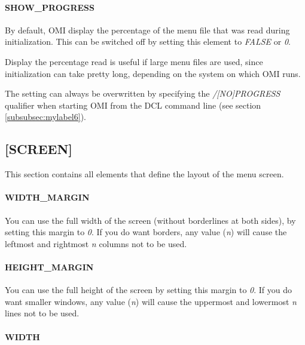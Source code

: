 \documentclass[a4paper]{book}
\newcommand{\vs}{\vspace{3mm}}
\begin{document}
\paragraph{SHOW{\_}PROGRESS}
\label{para:mylabel2}

By default, OMI display the percentage of the menu file that was read during 
initialization. This can be switched off by setting this element to \textsl{FALSE} or \textsl{0}.

\vs

Display the percentage read is useful if large menu files are used, since 
initialization can take pretty long, depending on the system on which OMI 
runs.

\vs

The setting can always be overwritten by specifying the \textsl{/[NO]PROGRESS} 
qualifier when starting OMI from the DCL command line (see section
\ref{subsubsec:mylabel6}).

\subsection{[SCREEN]}
\label{subsubsec:mylabel17}

This section contains all elements that define the layout of the menu 
screen.

\paragraph{WIDTH{\_}MARGIN}

You can use the full width of the screen (without borderlines at both 
sides), by setting this margin to \textsl{0}. If you do want borders, any value 
(\textit{n}) will cause the leftmost and rightmost \textit{n} columns not to be used.

\paragraph{HEIGHT{\_}MARGIN}

You can use the full height of the screen by setting this margin to \textsl{0}. If 
you do want smaller windows, any value (\textit{n}) will cause the uppermost and 
lowermost \textit{n} lines not to be used.

\paragraph{WIDTH}
\end{document}
